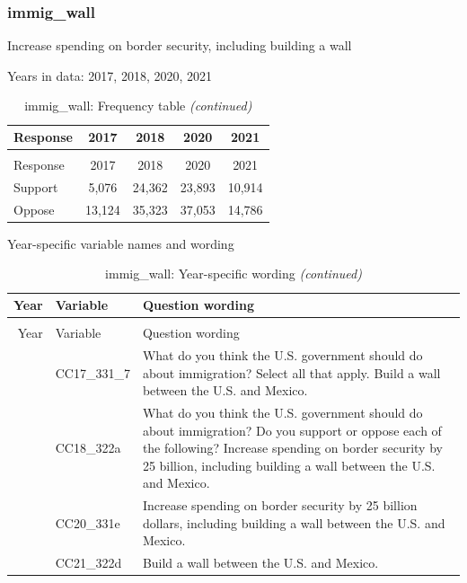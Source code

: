 \documentclass[
  12pt]{article}
\begin{document}
\hypertarget{immig_wall}{%
\subsubsection{immig\_wall}\label{immig_wall}}

Increase spending on border security, including building a wall

Years in data: 2017, 2018, 2020,
2021\begingroup\fontsize{10}{12}\selectfont

\begin{longtable}[t]{lcccc}
\caption{\label{tab:unnamed-chunk-5}immig\_wall: Frequency table}\\
\toprule
Response & 2017 & 2018 & 2020 & 2021\\
\midrule
\endfirsthead
\caption[]{immig\_wall: Frequency table \textit{(continued)}}\\
\toprule
Response & 2017 & 2018 & 2020 & 2021\\
\midrule
\endhead

\endfoot
\bottomrule
\endlastfoot
Support & 5,076 & 24,362 & 23,893 & 10,914\\
Oppose & 13,124 & 35,323 & 37,053 & 14,786\\*
\end{longtable}
\endgroup{}

Year-specific variable names and
wording\begingroup\fontsize{11}{13}\selectfont

\begin{longtable}[t]{rl>{\raggedright\arraybackslash}p{10cm}}
\caption{\label{tab:unnamed-chunk-5}immig\_wall: Year-specific wording}\\
\toprule
Year & Variable & Question wording\\
\midrule
\endfirsthead
\caption[]{immig\_wall: Year-specific wording \textit{(continued)}}\\
\toprule
Year & Variable & Question wording\\
\midrule
\endhead

\endfoot
\bottomrule
\endlastfoot
2017 & CC17\_331\_7 & What do you think the U.S. government should do about immigration? Select all that apply. Build a wall between the U.S. and Mexico.\\
\addlinespace
2018 & CC18\_322a & What do you think the U.S. government should do about immigration? Do you support or oppose each of the following? Increase spending on border security by 25 billion, including building a wall between the U.S. and Mexico.\\
\addlinespace
2020 & CC20\_331e & Increase spending on border security by 25 billion dollars, including building a wall between the U.S. and Mexico.\\
\addlinespace
2021 & CC21\_322d & Build a wall between the U.S. and Mexico.\\*
\end{longtable}
\endgroup{}
\newpage
\end{document}
